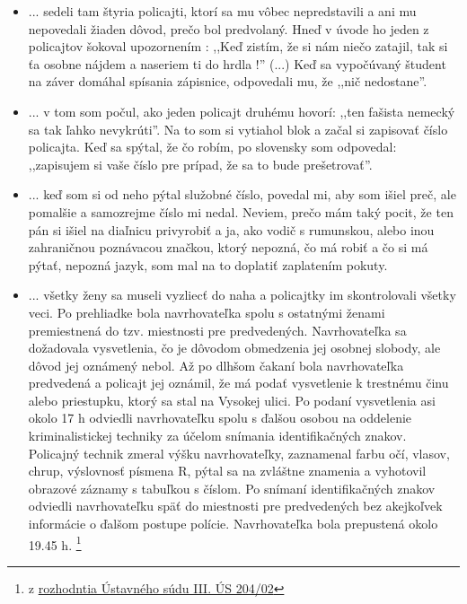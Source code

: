 \documentclass[openany]{book}
\begin{document}
\begin{itemize}
\item ... sedeli tam štyria policajti, ktorí sa mu vôbec nepredstavili a ani mu nepovedali žiaden dôvod, prečo bol predvolaný. Hneď v úvode ho jeden z policajtov šokoval upozornením : ,,Keď zistím, že si nám niečo zatajil, tak si ťa osobne nájdem a naseriem ti do hrdla !'' (...) Keď sa vypočúvaný študent na záver domáhal spísania zápisnice, odpovedali mu, že ,,nič nedostane''. \cite{streetparty}
\item ... v tom som počul, ako jeden policajt druhému hovorí: ,,ten fašista nemecký sa tak ľahko nevykrúti''. Na to som si vytiahol blok a začal si zapisovať číslo policajta. Keď sa spýtal, že čo robím, po slovensky som odpovedal: ,,zapisujem si vaše číslo pre prípad, že sa to bude prešetrovať''. \cite{sme-fasista}
\item ... keď som si od neho pýtal služobné číslo, povedal mi, aby som išiel preč, ale pomalšie a samozrejme číslo mi nedal. Neviem, prečo mám taký pocit, že ten pán si išiel na diaľnicu privyrobiť a ja, ako vodič s rumunskou, alebo inou zahraničnou poznávacou značkou, ktorý nepozná, čo má robiť a čo si má pýtať, nepozná jazyk, som mal na to doplatiť zaplatením pokuty. \cite{sme-rumun}
\item ... všetky ženy sa museli vyzliecť do naha a policajtky im skontrolovali všetky veci. Po prehliadke bola navrhovateľka spolu s ostatnými ženami premiestnená do tzv. miestnosti pre predvedených. Navrhovateľka sa dožadovala vysvetlenia, čo je dôvodom obmedzenia jej osobnej slobody, ale dôvod jej oznámený nebol. Až po dlhšom čakaní bola navrhovateľka predvedená a policajt jej oznámil, že má podať vysvetlenie k trestnému činu alebo priestupku, ktorý sa stal na Vysokej ulici. Po podaní vysvetlenia asi okolo 17 h odviedli navrhovateľku spolu s ďalšou osobou na oddelenie kriminalistickej techniky za účelom snímania identifikačných znakov. Policajný technik zmeral výšku navrhovateľky, zaznamenal farbu očí, vlasov, chrup, výslovnosť písmena R, pýtal sa na zvláštne znamenia a vyhotovil obrazové záznamy s tabuľkou s číslom. Po snímaní identifikačných znakov odviedli navrhovateľku späť do miestnosti pre predvedených bez akejkoľvek informácie o ďalšom postupe polície. Navrhovateľka bola prepustená okolo 19.45 h. \footnote{z \href{http://www.concourt.sk/rozhod.do?urlpage=dokument&id_spisu=14751}{rozhodntia Ústavného súdu III. ÚS 204/02}}

\end{itemize}
\end{document}

